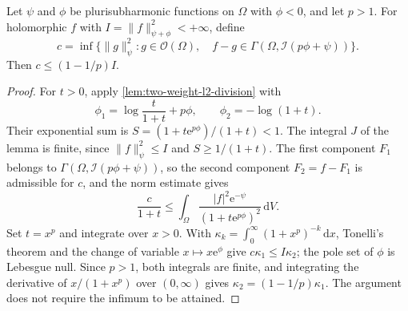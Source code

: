 \begin{proposition}\label{prop:one-weight-ideal-distance}
Let $\psi$ and $\phi$ be plurisubharmonic functions on $\Omega$ with $\phi<0$, and let $p>1$. For holomorphic $f$ with $I=\|f\|_{\psi+\phi}^2<+\infty$, define
\[
 c=\inf\{\|g\|_\psi^2:g\in\mathcal O(\Omega),\quad
                   f-g\in\Gamma(\Omega,\mathcal I(p\phi+\psi))\}.
\]
Then $c\leq(1-1/p)I$.
\end{proposition}
\begin{proof}
For $t>0$, apply \cref{lem:two-weight-l2-division} with
\[
 \phi_1=\log\frac{t}{1+t}+p\phi,\qquad
 \phi_2=-\log(1+t).
\]
Their exponential sum is $S=(1+t\mathrm e^{p\phi})/(1+t)<1$. The integral $J$ of the lemma is finite, since $\|f\|_\psi^2\leq I$ and $S\geq1/(1+t)$. The first component $F_1$ belongs to $\Gamma(\Omega,\mathcal I(p\phi+\psi))$, so the second component $F_2=f-F_1$ is admissible for $c$, and the norm estimate gives
\[
 \frac{c}{1+t}\leq
   \int_\Omega\frac{|f|^2\mathrm e^{-\psi}}
                         {(1+t\mathrm e^{p\phi})^2}\,\mathrm{d}V.
\]
Set $t=x^p$ and integrate over $x>0$. With $\kappa_k=\int_0^\infty(1+x^p)^{-k}\,\mathrm{d}x$, Tonelli's theorem and the change of variable $x\mapsto x\mathrm e^\phi$ give $c\kappa_1\leq I\kappa_2$; the pole set of $\phi$ is Lebesgue null. Since $p>1$, both integrals are finite, and integrating the derivative of $x/(1+x^p)$ over $(0,\infty)$ gives $\kappa_2=(1-1/p)\kappa_1$. The argument does not require the infimum to be attained.
\end{proof}

